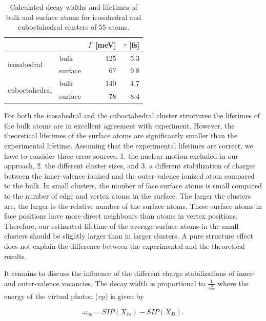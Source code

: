 \begin{table}[h]
 \centering
 \caption{Calculated decay widths and lifetimes of bulk and surface atoms
          for icosahedral and cuboctahedral clusters of 55 atoms.}
 \begin{tabular}{llrr}
  \toprule
               &                            & $\Gamma$ [meV] & $\tau$ [fs]\\
  \midrule
   \multirow{2}{*}{icosahedral}   & bulk    & 125            & 5.3 \\
                                  & surface &  67            & 9.8 \\
  \midrule
   \multirow{2}{*}{cuboctahedral} & bulk    & 140            & 4.7 \\
                                  & surface &  78            & 8.4 \\
  \bottomrule
 \end{tabular}
 \label{table:lifetimes}
\end{table}

For both the icosahedral and the cuboctahedral cluster structures the lifetimes
of the bulk atoms are in excellent agreement with experiment.
However, the theoretical lifetimes of the surface atoms are significantly
smaller than the experimental lifetime. Assuming that the
experimental lifetimes are correct, we have to consider three error sources:
1. the nuclear motion excluded in our approach, 2. the different cluster sizes,
and 3. a different stabilization of charges between the
inner-valence ionized and the outer-valence ionized atom compared to the bulk.
In small clusters, the number of face surface atoms is small compared to the
number of edge and vertex atoms in the surface. The larger the clusters are,
the larger is the relative number of the surface atoms. These surface atoms
in face positions have more direct neighbours than atoms in vertex positions.
Therefore, our estimated lifetime of the average surface atoms in the small
clusters should be slightly larger than in larger clusters. A pure structure
effect does not explain the difference between the experimental and the
theoretical results.

It remains to discuss the influence of the different charge stabilizations of
inner- and outer-valence vacancies. The decay width is proportional to
$\frac{1}{\omega_{vp}^4}$ where the energy of the virtual photon ($vp$) is given
by

\begin{equation}
 \omega_{vp} = SIP(X_{in}) - SIP(X_D)   .
\end{equation}

